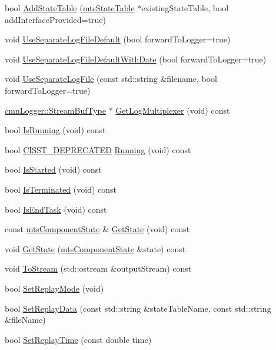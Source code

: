 \begin{DoxyCompactItemize}
\item 
bool \hyperlink{classmts_component_a5aac2a946a339738a9475772f71c9e0e}{Add\+State\+Table} (\hyperlink{classmts_state_table}{mts\+State\+Table} $\ast$existing\+State\+Table, bool add\+Interface\+Provided=true)
\item 
void \hyperlink{classmts_component_ab5b591dab8bacf138f972ec61d1f6d8e}{Use\+Separate\+Log\+File\+Default} (bool forward\+To\+Logger=true)
\item 
void \hyperlink{classmts_component_ae3b69d39e570c8465cb105b95ed59c65}{Use\+Separate\+Log\+File\+Default\+With\+Date} (bool forward\+To\+Logger=true)
\item 
void \hyperlink{classmts_component_a0dd9bd8b7fcd7d7e09871d0ace126699}{Use\+Separate\+Log\+File} (const std\+::string \&filename, bool forward\+To\+Logger=true)
\item 
\hyperlink{classcmn_logger_a7d192777882d1dc6bb48ceac0b4e65bb}{cmn\+Logger\+::\+Stream\+Buf\+Type} $\ast$ \hyperlink{classmts_component_a368c7115c8d9533d634077b2d76af18b}{Get\+Log\+Multiplexer} (void) const 
\item 
bool \hyperlink{classmts_component_ac6f03b0bddadb0bf316e4c62726c3928}{Is\+Running} (void) const 
\item 
bool \hyperlink{cmn_portability_8h_a63da7164735f9501be651b1f2bbc0121}{C\+I\+S\+S\+T\+\_\+\+D\+E\+P\+R\+E\+C\+A\+T\+E\+D} \hyperlink{classmts_component_a70c67f9502b7779ca6121a9b31034088}{Running} (void) const 
\item 
bool \hyperlink{classmts_component_a63a779dbed36bae9490a885a66abb14d}{Is\+Started} (void) const 
\item 
bool \hyperlink{classmts_component_afee031d17dd144505bdb2400c20c787f}{Is\+Terminated} (void) const 
\item 
bool \hyperlink{classmts_component_a9ea79bb1ef93b96f9caab0dd382fcd16}{Is\+End\+Task} (void) const 
\item 
const \hyperlink{classmts_component_state}{mts\+Component\+State} \& \hyperlink{classmts_component_accc6e7dd1a32c10a4d3235f261b5fdcc}{Get\+State} (void) const 
\item 
void \hyperlink{classmts_component_a3a1956b97486a0ee89cc86c73004c9ce}{Get\+State} (\hyperlink{classmts_component_state}{mts\+Component\+State} \&state) const 
\item 
void \hyperlink{classmts_component_aa654d2a0e1d1a9298ef2c8e5d69514df}{To\+Stream} (std\+::ostream \&output\+Stream) const 
\item 
bool \hyperlink{classmts_component_a13d754f15ab268dbbbe433780a635c1a}{Set\+Replay\+Mode} (void)
\item 
bool \hyperlink{classmts_component_a9837f59982f800aeacc8639c33533fc5}{Set\+Replay\+Data} (const std\+::string \&state\+Table\+Name, const std\+::string \&file\+Name)
\item 
bool \hyperlink{classmts_component_aef1ef1a98f5b97b7c8ffdf56adc48ab3}{Set\+Replay\+Time} (const double time)
\end{DoxyCompactItemize}
